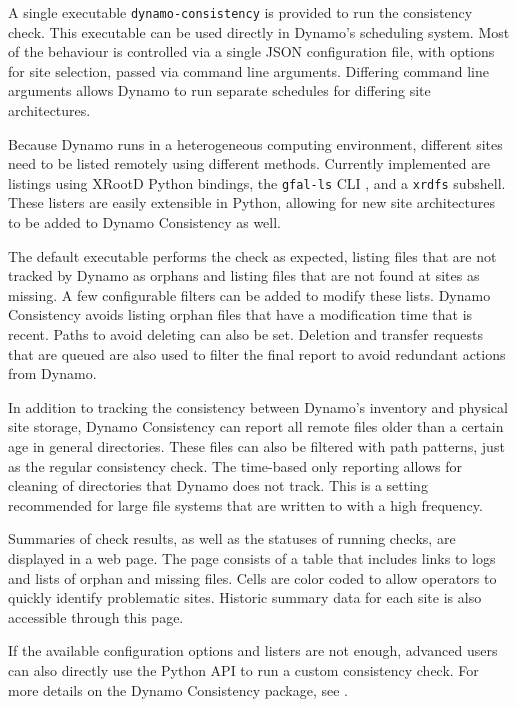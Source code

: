 A single executable \texttt{dynamo-consistency} is provided to run the consistency check.
This executable can be used directly in Dynamo’s scheduling system.
Most of the behaviour is controlled via a single JSON configuration file,
with options for site selection, passed via command line arguments.
Differing command line arguments allows Dynamo to run separate schedules
for differing site architectures.

Because Dynamo runs in a heterogeneous computing environment,
different sites need to be listed remotely using different methods.
Currently implemented are listings using XRootD Python bindings,
the \texttt{gfal-ls} CLI \cite{laure2006programming}, and a \texttt{xrdfs} subshell.
These listers are easily extensible in Python,
allowing for new site architectures to be added to Dynamo Consistency as well.

The default executable performs the check as expected,
listing files that are not tracked by Dynamo as orphans
and listing files that are not found at sites as missing.
A few configurable filters can be added to modify these lists.
Dynamo Consistency avoids listing orphan files that have a modification time that is recent.
Paths to avoid deleting can also be set.
Deletion and transfer requests that are queued are also used to filter the final report
to avoid redundant actions from Dynamo.

In addition to tracking the consistency between Dynamo’s inventory and physical site storage,
Dynamo Consistency can report all remote files older than a certain age
in general directories.
These files can also be filtered with path patterns, just as the regular consistency check.
The time-based only reporting allows for cleaning of directories that Dynamo does not track.
This is a setting recommended for large file systems
that are written to with a high frequency.

Summaries of check results, as well as the statuses of running checks,
are displayed in a web page.
The page consists of a table that includes links to logs and
lists of orphan and missing files.
Cells are color coded to allow operators to quickly identify problematic sites.
Historic summary data for each site is also accessible through this page.

If the available configuration options and listers are not enough,
advanced users can also directly use the Python API to run a custom consistency check.
For more details on the Dynamo Consistency package,
see \cite{dynamo_consistency}.

